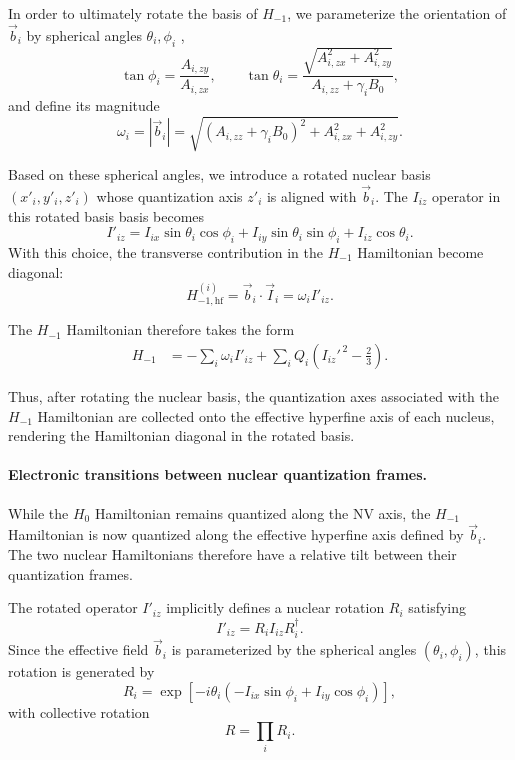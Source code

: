 In order to ultimately rotate the basis of $H_{-1}$, we parameterize the orientation of $\vec b_i$ by spherical angles $\theta_i,\phi_i$ \cite{schweiger2001principles},
\begin{equation}
\tan\phi_i = \frac{A_{i,zy}}{A_{i,zx}},
\qquad
\tan\theta_i = \frac{\sqrt{A_{i,zx}^2+A_{i,zy}^2}}
{A_{i,zz}+\gamma_iB_0},
\label{eq:angles}
\end{equation}
and define its magnitude
\begin{equation}
\omega_i = |\vec b_i| =
\sqrt{ (A_{i,zz}+\gamma_iB_0)^2
+ A_{i,zx}^2
+ A_{i,zy}^2 }.
\label{eq:omega_i}
\end{equation}

Based on these spherical angles, we introduce a rotated nuclear basis $(x'_i,y'_i,z'_i)$ whose quantization axis $z'_i$ is aligned with $\vec b_i$. The $I_{iz}$ operator in this rotated basis basis becomes 
\begin{equation}
    I'_{iz} = I_{ix}\sin\theta_i\cos\phi_i 
    + I_{iy}\sin\theta_i\sin\phi_i 
    + I_{iz}\cos\theta_i.
    \label{eq:Izprime}
\end{equation}
With this choice, the transverse contribution in the $H_{-1}$ Hamiltonian become diagonal:
\[
H^{(i)}_{-1,\mathrm{hf}}= \vec b_i\cdot\vec I_i = \omega_i I'_{iz}.
\]

The $H_{-1}$ Hamiltonian therefore takes the form
\begin{align}
H_{-1}
&=
-\sum_i\omega_i I'_{iz}
+
\sum_iQ_i\!\left(I_{iz}'^{\,2}-\tfrac23\right).
\label{eq:H-1_rot}
\end{align}

Thus, after rotating the nuclear basis, the quantization axes associated with the $H_{-1}$ Hamiltonian are collected onto the effective hyperfine axis of each nucleus, rendering the Hamiltonian diagonal in the rotated basis.\\

\paragraph{Electronic transitions between nuclear quantization frames.}

While the $H_0$ Hamiltonian remains quantized along the NV axis, the $H_{-1}$ Hamiltonian is now quantized along the effective hyperfine axis defined by $\vec b_i$. The two nuclear Hamiltonians therefore have a relative tilt between their quantization frames.

The rotated operator \(I'_{iz}\) implicitly defines a nuclear rotation
\(R_i\) satisfying
\[
I'_{iz}=R_i I_{iz} R_i^\dagger.
\]
Since the effective field \(\vec b_i\) is parameterized by the spherical angles \((\theta_i,\phi_i)\), this rotation is generated by
\[
R_i
=
\exp\!\left[
-i\theta_i
\left(
-I_{ix}\sin\phi_i
+
I_{iy}\cos\phi_i
\right)
\right],
\]
with collective rotation
\[
R=\prod_iR_i.
\]


